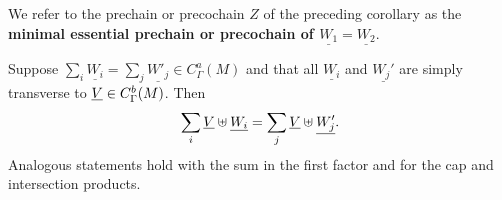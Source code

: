 \begin{definition}
We refer to the prechain or precochain $Z$ of the preceding corollary as the \textbf{minimal essential prechain or precochain of $\underline{W_1} = \underline{W_2}$}.
\end{definition}

\begin{proposition}\label{P: multicup}
	Suppose $\sum_i \underline{W_i} = \sum_j \underline{W'_j} \in C_\Gamma^a(M)$ and that all $\underline{W_i}$ and $\underline{W_j'}$ are simply transverse to $\underline{V} \in C_\Gamma^b(M)$.
	Then $$\sum_i \underline{V} \uplus \underline{W_i} = \sum_j \underline{V}\uplus \underline{W'_j}.$$
	Analogous statements hold with the sum in the first factor and for the cap and intersection products.
\end{proposition}

